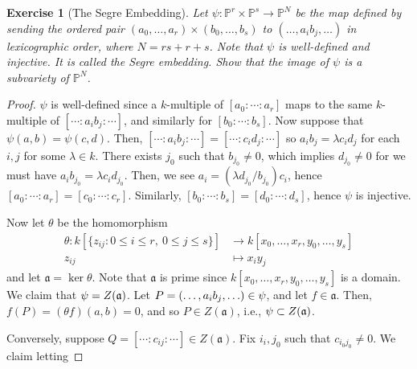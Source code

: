 \documentclass[12pt,letterpaper]{article}
\newtheorem{problem}{Exercise}[section]
\theoremstyle{definition}
\theoremstyle{remark}
\numberwithin{equation}{section}
\numberwithin{figure}{problem}
\let\Im\relax
\DeclareMathOperator{\Im}{im}
\newcommand{\PP}{\mathbb{P}}
\begin{document}
\begin{problem}[The Segre Embedding]\label{exc:2.14}
  Let $\psi\colon \PP^r \times \PP^s \to \PP^N$ be the map defined by sending
  the ordered pair $(a_0, \ldots, a_r) \times (b_0, \ldots, b_s)$ to $(\ldots,
  a_ib_j, \ldots)$ in lexicographic order, where $N = rs + r +s$. Note that
  $\psi$ is well-defined and injective. It is called the \emph{Segre embedding}.
  Show that the image of $\psi$ is a subvariety of $\PP^N$.
\end{problem}
\begin{proof}
  $\psi$ is well-defined since a $k$-multiple of $[a_0:\cdots:a_r]$ maps to the
  same $k$-multiple of $[\cdots:a_ib_j:\cdots]$, and similarly for
  $[b_0:\cdots:b_s]$. Now suppose that $\psi(a,b) = \psi(c,d)$. Then,
  $[\cdots:a_ib_j:\cdots] = [\cdots:c_id_j:\cdots]$ so $a_ib_j = \lambda c_id_j$
  for each $i,j$ for some $\lambda \in k$. There exists $j_0$ such that
  $b_{j_0} \ne 0$, which implies $d_{j_0} \ne 0$ for we must have
  $a_ib_{j_0} = \lambda c_id_{j_0}$. Then, we see $a_i = (\lambda
  d_{j_0}/b_{j_0}) c_i$, hence $[a_0:\cdots:a_r] = [c_0:\cdots:c_r]$. Similarly,
  $[b_0:\cdots:b_s] = [d_0:\cdots:d_s]$, hence $\psi$ is injective.
  \par Now let $\theta$ be the homomorphism
  \begin{align*}
    \theta\colon k[\{z_{ij} : 0\le i \le r,\ 0 \le j \le s\}] &\to
    k[x_0, \ldots, x_r, y_0, \ldots, y_s]\\
    z_{ij} &\mapsto x_iy_j
  \end{align*}
  and let $\mathfrak{a} = \ker\theta$. Note that $\mathfrak{a}$ is prime since
  $k[x_0, \ldots, x_r, y_0, \ldots, y_s]$ is a domain.
  We claim that $\Im \psi = Z(\mathfrak{a})$. Let $P = (\ldots, a_ib_j,\ldots)
  \in \Im \psi$, and let $f \in \mathfrak{a}$. Then, $f(P) = (\theta f)(a,b) =
  0$, and so $P \in Z(\mathfrak{a})$, i.e., $\Im \psi \subset Z(\mathfrak{a})$.
  \par Conversely, suppose $Q = [\cdots:c_{ij}:\cdots] \in Z(\mathfrak{a})$.
  Fix $i_i,j_0$ such that $c_{i_0j_0} \ne 0$. We claim letting

\end{proof}
\end{document}
